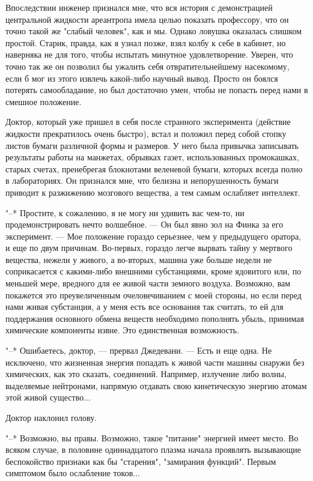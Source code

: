 Впоследствии инженер признался мне, что  вся  история  с  демонстрацией
центральной жидкости ареантропа имела целью показать  профессору,  что  он
точно такой же "слабый  человек",  как  и  мы.  Однако  ловушка  оказалась
слишком простой. Старик, правда, как я узнал позже, взял колбу  к  себе  в
кабинет, но наверняка не для того, чтобы испытать минутное удовлетворение.
Уверен, что точно так же он позволил бы  ужалить  себя  отвратительнейшему
насекомому, если б мог из этого извлечь какой-либо научный  вывод.  Просто
он боялся потерять самообладание, но был достаточно умен, чтобы не попасть
перед нами в смешное положение.

Доктор,  который  уже  пришел  в  себя  после  странного   эксперимента
(действие жидкости прекратилось очень быстро), встал и положил перед собой
стопку листов бумаги различной формы и  размеров.  У  него  была  привычка
записывать результаты работы на манжетах, обрывках  газет,  использованных
промокашках,  старых  счетах,  пренебрегая  блокнотами  веленевой  бумаги,
которых всегда полно в лабораториях.  Он  признался  мне,  что  белизна  и
непорушенность бумаги приводит к  разжижению  мозгового  вещества,  а  тем
самым ослабляет интеллект.

"--*  Простите,  к  сожалению,  я  не  могу  ни  удивить  вас  чем-то,  ни
продемонстрировать нечто волшебное. --- Он был явно  зол  на  Финка  за  его
эксперимент. --- Мое положение гораздо серьезнее, чем у предыдущего оратора,
и еще по двум причинам. Во-первых, гораздо легче вырвать тайну у  мертвого
вещества, нежели у живого,  а  во-вторых,  машина  уже  больше  недели  не
соприкасается с какими-либо внешними субстанциями, кроме ядовитого или, по
меньшей мере, вредного для ее живой части земного воздуха.  Возможно,  вам
покажется это преувеличенным очеловечиванием с моей стороны, но если перед
нами живая субстанция, а у меня есть все основания так считать, то ей  для
поддержания основного обмена веществ необходимо пополнять убыль,  принимая
химические компоненты извне. Это единственная возможность.

"--* Ошибаетесь, доктор, --- прервал  Джедевани.  ---  Есть  и  еще  одна.  Не
исключено, что жизненная энергия попадать к живой части машины снаружи без
химических, как это сказать, соединений. Например, излучение  либо  волны,
выделяемые нейтронами, напрямую отдавать свою кинетическую энергию  атомам
этой живой существо...

Доктор наклонил голову.

"--* Возможно, вы правы. Возможно, такое "питание" энергией  имеет  место.
Во  всяком  случае,  в  половине  одиннадцатого  плазма  начала  проявлять
вызывающие беспокойство признаки как бы "старения",  "замирания  функций".
Первым симптомом было ослабление токов...

